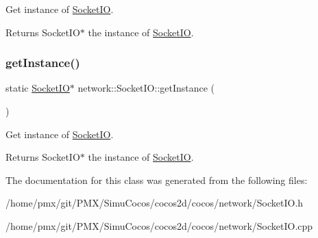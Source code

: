 Get instance of \hyperlink{classnetwork_1_1SocketIO}{Socket\+IO}.

\begin{DoxyReturn}{Returns}
Socket\+I\+O$\ast$ the instance of \hyperlink{classnetwork_1_1SocketIO}{Socket\+IO}. 
\end{DoxyReturn}
\mbox{\label{classnetwork_1_1SocketIO_a071858ead473c48e1a7b094f4e1f3102}} 
\subsubsection{\texorpdfstring{get\+Instance()}{getInstance()}\hspace{0.1cm}{\footnotesize\ttfamily [2/2]}}
{\footnotesize\ttfamily static \hyperlink{classnetwork_1_1SocketIO}{Socket\+IO}$\ast$ network\+::\+Socket\+I\+O\+::get\+Instance (\begin{DoxyParamCaption}{ }\end{DoxyParamCaption})\hspace{0.3cm}{\ttfamily [static]}}

Get instance of \hyperlink{classnetwork_1_1SocketIO}{Socket\+IO}.

\begin{DoxyReturn}{Returns}
Socket\+I\+O$\ast$ the instance of \hyperlink{classnetwork_1_1SocketIO}{Socket\+IO}. 
\end{DoxyReturn}


The documentation for this class was generated from the following files\+:\begin{DoxyCompactItemize}
\item 
/home/pmx/git/\+P\+M\+X/\+Simu\+Cocos/cocos2d/cocos/network/Socket\+I\+O.\+h\item 
/home/pmx/git/\+P\+M\+X/\+Simu\+Cocos/cocos2d/cocos/network/Socket\+I\+O.\+cpp\end{DoxyCompactItemize}
